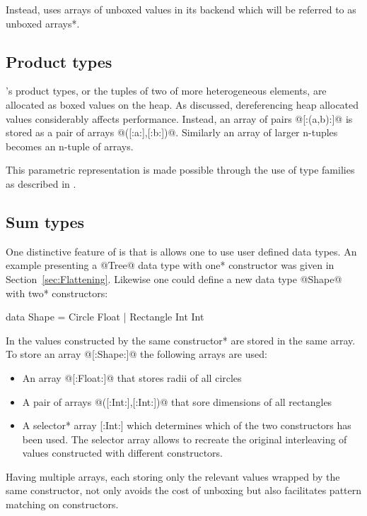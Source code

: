 \documentclass[preamble.tex]{subfiles}
\begin{document}
Instead, \DPH uses arrays of unboxed values in its backend which will be referred to as \*unboxed arrays*.


\subsection{Product types}

\Haskell's product types, or the tuples of two of more heterogeneous elements, are allocated as boxed values on the heap. As discussed, dereferencing heap allocated values considerably affects performance. Instead, an array of pairs @[:(a,b):]@ is stored as a pair of arrays @([:a:],[:b:])@. Similarly an array of larger n-tuples becomes an n-tuple of arrays.

This parametric representation is made possible through the use of type families as described in \cite{CDL09}.


\subsection{Sum types}

One distinctive feature of \DPH is that is allows one to use user defined data types. An example presenting a @Tree@ data type with \*one* constructor was given in Section~\ref{sec:Flattening}. Likewise one could define a new data type @Shape@ with \*two* constructors:

\begin{hscode}
data Shape = Circle Float
           | Rectangle Int Int
\end{hscode}

In \DPH the values constructed by the \*same constructor* are stored in the same array. To store an array @[:Shape:]@ the following arrays are used:
\begin{itemize}
\item An array @[:Float:]@ that stores radii of all circles
\item A pair of arrays @([:Int:],[:Int:])@ that sore dimensions of all rectangles
\item A \*selector* array [:Int:] which determines which of the two constructors has been used. The selector array allows to recreate the original interleaving of values constructed with different constructors.
\end{itemize}

Having multiple arrays, each storing only the relevant values wrapped by the same constructor, not only avoids the cost of unboxing but also facilitates pattern matching on constructors.
\end{document}
